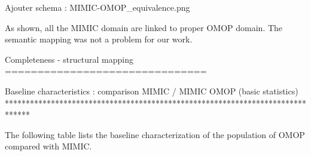Ajouter schema : MIMIC-OMOP\_equivalence.png

As shown, all the MIMIC domain are linked to proper OMOP domain. 
The semantic mapping was not a problem for our work.

Completeness - structural mapping 
===============================

Baseline characteristics : comparison MIMIC / MIMIC OMOP (basic statistics)
******************************************************************************

The following table lists the baseline characterization of the population of
OMOP compared with MIMIC.

\begin{table*}[t]
\end{table*}
